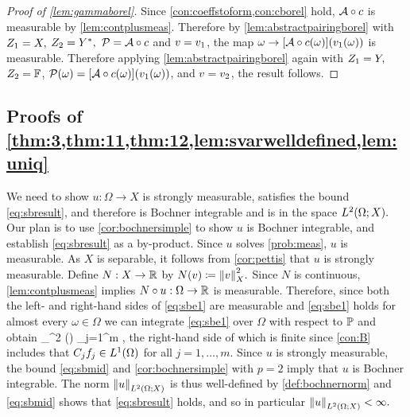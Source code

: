 \begin{proof}[Proof of \cref{lem:gammaborel}]
  Since \cref{con:coeffstoform,con:cborel} hold, $\mathcal A\circ c$ is measurable by \cref{lem:contplusmeas}. Therefore by \cref{lem:abstractpairingborel} with $Z_{1} = X,$ $Z_{2} = Y^{*},$ $\mathcal P = \mathcal A\circ c$ and $v = v_{1}$, the map $\omega \rightarrow \mleft[\toform\circ\coeff(\omega)\mright]\mleft(\vo(\omega)\mright)$ is measurable. Therefore applying \cref{lem:abstractpairingborel} again with $Z_{1} = Y,$ $Z_{2} = \mathbb F$, $\Pmap(\omega) = \mleft[\toform\circ\coeff(\omega)\mright]\mleft(\vo(\omega)\mright)$, and $v = v_{2}$, the result follows.
 \end{proof}




\subsection{Proofs of \cref{thm:3,thm:11,thm:12,lem:svarwelldefined,lem:uniq}}
\label{page:thm3proof}
We need to show $u:\Omega \rightarrow X$ is strongly measurable, satisfies the bound \eqref{eq:sbresult}, and therefore is Bochner integrable and is in the space $\LtOX.$ Our plan is to use \cref{cor:bochnersimple} to show $u$ is Bochner integrable, and establish \eqref{eq:sbresult} as a by-product. Since $u$ solves \cref{prob:meas}, $u$ is measurable. As $X$ is separable, it follows from \cref{cor:pettis} that $u$ is strongly measurable.
Define $N:X \rightarrow \mathbb R$ by
$ N(v) \de \N{v}_X^2.$
Since $N$ is continuous, \cref{lem:contplusmeas} implies $N \circ u:\Omega \rightarrow \mathbb R$ is measurable. 
Therefore, since both the left- and right-hand sides of \eqref{eq:sbe1} are measurable and \eqref{eq:sbe1} holds for almost every $\omega \in \Omega$ we can integrate \eqref{eq:sbe1} over $\Omega$ with respect to $\mathbb P$ and obtain
\beq\label{eq:sbmid}
\int_\Omega {}^2 \dd\PP(\omega) \leq \sum_{j=1}^m \NLoO{\Cj\fj},
\eeq
the right-hand side of which is finite since \cref{con:B} includes that $\Cj\fj \in \LoO$ for all $j = 1,\ldots,m.$ Since $u$ is strongly measurable, the bound \eqref{eq:sbmid} and \cref{cor:bochnersimple} with $p=2$ imply that $u$ is Bochner integrable. The norm $\NLtOX{u}$ is thus well-defined by \cref{def:bochnernorm} and \eqref{eq:sbmid} shows that \eqref{eq:sbresult} holds, and so in particular $\NLtOX{u} < \infty.$
\epf

